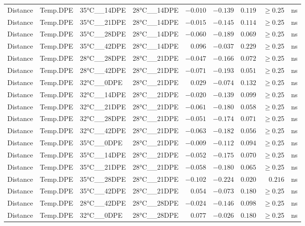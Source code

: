 \documentclass[
]{article}
\begin{document}
\begin{longtable}{llllrrrrl}
Distance & Temp.DPE & 35°C\_\_14DPE & 28°C\_\_14DPE & $-0.010$ & $-0.139$ & $0.119$ & $\geq$0.25 & ns \\ 
Distance & Temp.DPE & 35°C\_\_21DPE & 28°C\_\_14DPE & $-0.015$ & $-0.145$ & $0.114$ & $\geq$0.25 & ns \\ 
Distance & Temp.DPE & 35°C\_\_28DPE & 28°C\_\_14DPE & $-0.060$ & $-0.189$ & $0.069$ & $\geq$0.25 & ns \\ 
Distance & Temp.DPE & 35°C\_\_42DPE & 28°C\_\_14DPE & $0.096$ & $-0.037$ & $0.229$ & $\geq$0.25 & ns \\ 
Distance & Temp.DPE & 28°C\_\_28DPE & 28°C\_\_21DPE & $-0.047$ & $-0.166$ & $0.072$ & $\geq$0.25 & ns \\ 
Distance & Temp.DPE & 28°C\_\_42DPE & 28°C\_\_21DPE & $-0.071$ & $-0.193$ & $0.051$ & $\geq$0.25 & ns \\ 
Distance & Temp.DPE & 32°C\_\_0DPE & 28°C\_\_21DPE & $0.029$ & $-0.074$ & $0.132$ & $\geq$0.25 & ns \\ 
Distance & Temp.DPE & 32°C\_\_14DPE & 28°C\_\_21DPE & $-0.020$ & $-0.139$ & $0.099$ & $\geq$0.25 & ns \\ 
Distance & Temp.DPE & 32°C\_\_21DPE & 28°C\_\_21DPE & $-0.061$ & $-0.180$ & $0.058$ & $\geq$0.25 & ns \\ 
Distance & Temp.DPE & 32°C\_\_28DPE & 28°C\_\_21DPE & $-0.051$ & $-0.174$ & $0.071$ & $\geq$0.25 & ns \\ 
Distance & Temp.DPE & 32°C\_\_42DPE & 28°C\_\_21DPE & $-0.063$ & $-0.182$ & $0.056$ & $\geq$0.25 & ns \\ 
Distance & Temp.DPE & 35°C\_\_0DPE & 28°C\_\_21DPE & $-0.009$ & $-0.112$ & $0.094$ & $\geq$0.25 & ns \\ 
Distance & Temp.DPE & 35°C\_\_14DPE & 28°C\_\_21DPE & $-0.052$ & $-0.175$ & $0.070$ & $\geq$0.25 & ns \\ 
Distance & Temp.DPE & 35°C\_\_21DPE & 28°C\_\_21DPE & $-0.058$ & $-0.180$ & $0.065$ & $\geq$0.25 & ns \\ 
Distance & Temp.DPE & 35°C\_\_28DPE & 28°C\_\_21DPE & $-0.102$ & $-0.224$ & $0.020$ & $0.216$ & ns \\ 
Distance & Temp.DPE & 35°C\_\_42DPE & 28°C\_\_21DPE & $0.054$ & $-0.073$ & $0.180$ & $\geq$0.25 & ns \\ 
Distance & Temp.DPE & 28°C\_\_42DPE & 28°C\_\_28DPE & $-0.024$ & $-0.146$ & $0.098$ & $\geq$0.25 & ns \\ 
Distance & Temp.DPE & 32°C\_\_0DPE & 28°C\_\_28DPE & $0.077$ & $-0.026$ & $0.180$ & $\geq$0.25 & ns \\ 

\end{longtable}
\end{document}
